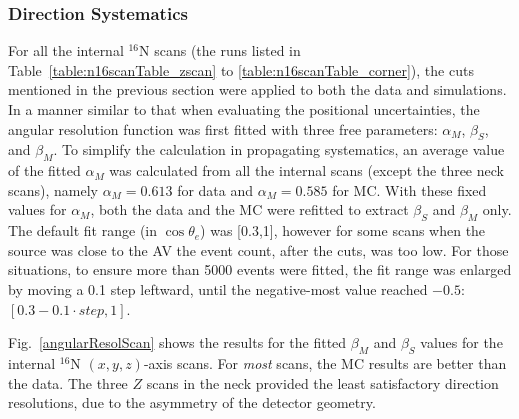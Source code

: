 \subsubsection{Direction Systematics} \label{sect:dirSystematics}

For all the internal $^{16}$N scans (the runs listed in Table~\ref{table:n16scanTable_zscan} to \ref{table:n16scanTable_corner}), the cuts mentioned in the previous section were applied to both the data and simulations. In a manner similar to that when evaluating the positional uncertainties, the angular resolution function was first fitted with three free parameters: $\alpha_M$, $\beta_S$, and $\beta_M$. To simplify the calculation in propagating systematics, an average value of the fitted $\alpha_M$ was calculated from all the internal scans (except the three neck scans), namely $\alpha_M =  0.613$ for data and $\alpha_M = 0.585$ for MC. With these fixed values for $\alpha_M$, both the data and the MC were refitted to extract $\beta_S$ and $\beta_M$ only. The default fit range (in $\cos \theta_e$) was [0.3,1], however for some scans when the source was close to the AV the event count, after the cuts, was too low. For those situations, to ensure more than 5000 events were fitted, the fit range was enlarged by moving a 0.1 step leftward, until the negative-most value reached $-0.5$: $[0.3-0.1 \cdot step, 1]$.

Fig.~\ref{angularResolScan} shows the results for the fitted $\beta_M$ and $\beta_S$ values for the internal $^{16}$N $(x,y,z)$-axis scans. For {\em most} scans, the MC results are better than the data. The three $Z$ scans in the neck provided the least satisfactory direction resolutions, due to the asymmetry of the detector geometry.

